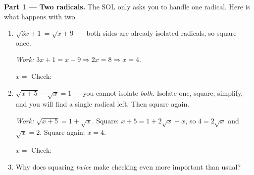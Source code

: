 \documentclass[10pt]{article}
\begin{document}
\begin{tcolorbox}[colback=white, colframe=black!40, title=\textbf{Tier E --- Extension},
    fonttitle=\bfseries, arc=1.5mm, left=3mm, right=3mm, top=2mm, bottom=2mm, breakable]
\textbf{Part 1 --- Two radicals.} The SOL only asks you to handle one radical. Here is what happens
with two.
\begin{enumerate}[label=(\alph*), leftmargin=1.9em, itemsep=6pt]
  \item $\sqrt{3x+1}=\sqrt{x+9}$ \; --- both sides are already isolated radicals, so square once.

        {\small \emph{Work:} $3x+1=x+9 \Rightarrow 2x=8 \Rightarrow x=4$.}

        $x=$  \quad Check: 
  \item $\sqrt{x+5}-\sqrt{x}=1$ \; --- you cannot isolate \emph{both}. Isolate one, square,
        simplify, and you will find a single radical left. Then square again.

        {\small \emph{Work:} $\sqrt{x+5}=1+\sqrt{x}$. Square:
        $x+5=1+2\sqrt{x}+x$, so $4=2\sqrt{x}$ and $\sqrt{x}=2$. Square again: $x=4$.}

        $x=$  \quad Check: 
  \item Why does squaring \emph{twice} make checking even more important than usual?
\end{enumerate}


\end{tcolorbox}
\end{document}
